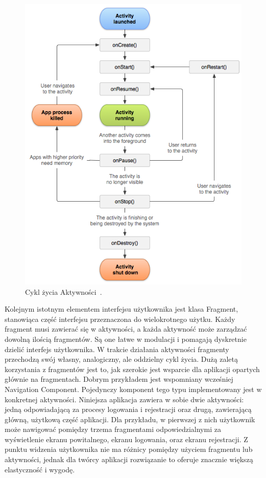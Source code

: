     \vspace{1cm}
    \begin{figure}[!ht]%
        \centering
        \includegraphics[scale=0.4]{src/activity_lifecycle.png}
        \caption{Cykl życia Aktywności~\cite{LIFECYCLE}.\label{lifecycle}}
        \qquad
    \end{figure} 
    \vspace{1cm}

\newpage
    Kolejnym istotnym elementem interfejsu użytkownika jest klasa Fragment, stanowiąca część interfejsu przeznaczona do wielokrotnego użytku. Każdy fragment musi zawierać się w aktywności, a każda aktywność 
    może zarządzać dowolną ilością fragmentów. Są one łatwe w modulacji i pomagają dyskretnie dzielić interfejs użytkownika. W trakcie działania aktywności fragmenty przechodzą swój własny, analogiczny, 
    ale oddzielny cykl życia. Dużą zaletą korzystania z fragmentów jest to, jak szerokie jest wsparcie dla aplikacji opartych głównie na fragmentach. Dobrym przykładem jest wspomniany wcześniej Navigation 
    Component. Pojedynczy komponent tego typu implementowany jest w konkretnej aktywności. Niniejsza aplikacja zawiera w sobie dwie aktywności: jedną odpowiadającą za procesy logowania i rejestracji oraz drugą, 
    zawierającą główną, użytkową część aplikacji. Dla przykładu, w pierwszej z nich użytkownik może nawigować pomiędzy trzema fragmentami odpowiedzialnymi za wyświetlenie ekranu powitalnego, ekranu logowania,
    oraz ekranu rejestracji. Z punktu widzenia użytkownika nie ma różnicy pomiędzy użyciem fragmentu lub aktywności, jednak dla twórcy aplikacji rozwiązanie to oferuje znacznie większą elastyczność i wygodę.

